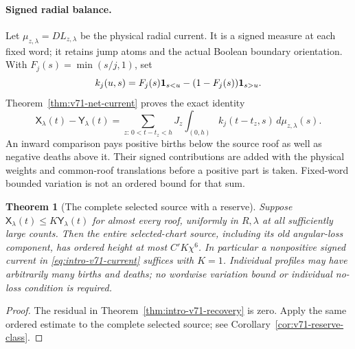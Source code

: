 \documentclass[11pt,reqno]{amsart}
\numberwithin{equation}{section}
\newtheorem{leadtheorem}{Theorem}
\theoremstyle{definition}\newtheorem{definition}[theorem]{Definition}
\theoremstyle{remark}\newtheorem{remark}[theorem]{Remark}
\begin{document}
\paragraph{Signed radial balance.}
Let $\mu_{z,\lambda}=DL_{z,\lambda}$ be the physical radial
current. It is a signed measure at each fixed word; it retains jump
atoms and the actual Boolean boundary orientation. With
$F_j(s)=\min(s/j,1)$, set
\[
 k_j(u,s)=F_j(s)\mathbf1_{s<u}-(1-F_j(s))\mathbf1_{s>u}.
\]
Theorem~\ref{thm:v71-net-current} proves the exact identity
\begin{equation}\label{eq:intro-v71-current}
 \mathsf X_\lambda(t)-\mathsf Y_\lambda(t)
  =\sum_{z:\,0<t-t_z<h}J_z
         \int_{(0,h)}k_j(t-t_z,s)\,d\mu_{z,\lambda}(s).
\end{equation}
An inward comparison pays positive births below the source roof as
well as negative deaths above it. Their signed contributions are added
with the physical weights and common-roof translations before a
positive part is taken. Fixed-word bounded variation is not an ordered
bound for that sum.

\begin{leadtheorem}[The complete selected source with a reserve]
\label{thm:intro-v71-reserve}
Suppose $\mathsf X_\lambda(t)\le K\mathsf Y_\lambda(t)$ for
almost every roof, uniformly in $R,\lambda$ at all sufficiently
large counts. Then the entire selected-chart source, including its
old angular-loss component, has ordered height at most $C'K\chi^6$.
In particular a nonpositive signed current in
\eqref{eq:intro-v71-current} suffices with $K=1$. Individual
profiles may have arbitrarily many births and deaths; no wordwise
variation bound or individual no-loss condition is required.
\end{leadtheorem}
\begin{proof}
The residual in Theorem~\ref{thm:intro-v71-recovery} is zero.
Apply the same ordered estimate to the complete selected source;
see Corollary~\ref{cor:v71-reserve-class}.
\end{proof}
\end{document}
